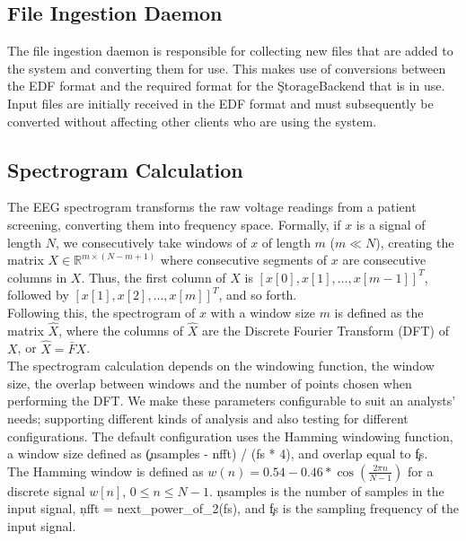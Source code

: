 \subsection{File Ingestion Daemon}

The file ingestion daemon is responsible for collecting new files that are
added to the system and converting them for use. This makes use of conversions
between the EDF format and the required format for the \c{StorageBackend} that
is in use. Input files are initially received in the EDF format and must
subsequently be converted without affecting other clients who are using the
system.

\subsection{Spectrogram Calculation}\label{compute-ch:design-spectrogram}

The EEG spectrogram transforms the raw voltage readings from a patient
screening, converting them into frequency space. Formally, if $x$ is a signal
of length $N$, we consecutively take windows of $x$ of length $m$ ($m \ll N$),
creating the matrix $X \in \mathbb{R}^{m \times (N - m + 1)}$ where consecutive
segments of $x$ are consecutive columns in $X$. Thus, the first column of $X$
is $[x[0], x[1], \ldots, x[m-1]]^T$, followed by $[x[1], x[2], \ldots,
x[m]]^T$, and so forth. \\

Following this, the spectrogram of $x$ with a window size $m$ is defined as the
matrix $\hat{X}$, where the columns of $\hat{X}$ are the Discrete Fourier
Transform (DFT) of $X$, or $\hat{X} = \bar{F}X$. \\

The spectrogram calculation depends on the windowing function, the window size,
the overlap between windows and the number of points chosen when performing the
DFT. We make these parameters configurable to suit an analysts' needs;
supporting different kinds of analysis and also testing for different
configurations. The default configuration uses the Hamming windowing function,
a window size defined as \c{(nsamples - nfft) / (fs * 4)}, and overlap equal to
\c{fs}. \\

The Hamming window is defined as $w(n) = 0.54 - 0.46*\cos(\frac{2 \pi n}{N
  -1})$ for a discrete signal $w[n]$, $0 \leq n \leq N -1$. \c{nsamples} is the
number of samples in the input signal, \c{nfft = next\_power\_of\_2(fs)},
and \c{fs} is the sampling frequency of the input signal.

